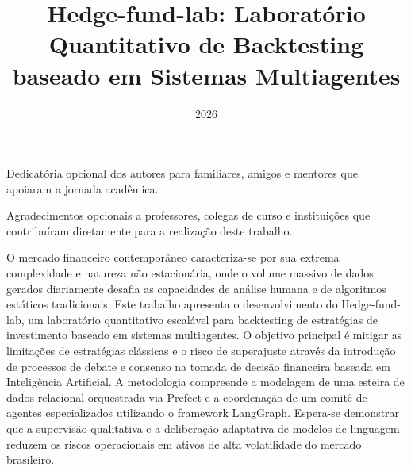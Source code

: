 \documentclass{eic-bcc-tcc}
\title{Hedge-fund-lab: Laboratório Quantitativo de Backtesting baseado em Sistemas Multiagentes}
\date{2026}
\begin{document}
\maketitle

\begin{dedicatoria}
Dedicatória opcional dos autores para familiares, amigos e mentores que apoiaram a jornada acadêmica.
\end{dedicatoria}

\begin{agradecimentos}
Agradecimentos opcionais a professores, colegas de curso e instituições que contribuíram diretamente para a realização deste trabalho.
\end{agradecimentos}

\makeapproval

\begin{resumo}
O mercado financeiro contemporâneo caracteriza-se por sua extrema complexidade e natureza não estacionária, onde o volume massivo de dados gerados diariamente desafia as capacidades de análise humana e de algoritmos estáticos tradicionais. Este trabalho apresenta o desenvolvimento do Hedge-fund-lab, um laboratório quantitativo escalável para backtesting de estratégias de investimento baseado em sistemas multiagentes. O objetivo principal é mitigar as limitações de estratégias clássicas e o risco de superajuste através da introdução de processos de debate e consenso na tomada de decisão financeira baseada em Inteligência Artificial. A metodologia compreende a modelagem de uma esteira de dados relacional orquestrada via Prefect e a coordenação de um comitê de agentes especializados utilizando o framework LangGraph. Espera-se demonstrar que a supervisão qualitativa e a deliberação adaptativa de modelos de linguagem reduzem os riscos operacionais em ativos de alta volatilidade do mercado brasileiro.
\end{resumo}
\end{document}
